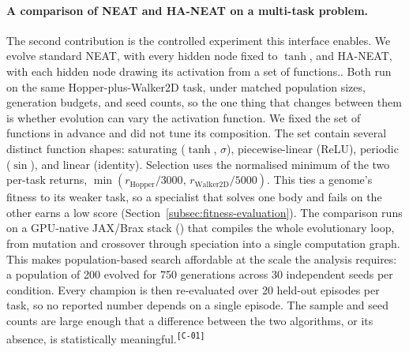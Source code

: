 \documentclass[12pt]{article}
\newcommand{\revID}[1]{\textsuperscript{\scriptsize\texttt{[#1]}}}
\newcommand{\revWeak}[2]{\textcolor{revOrange}{#2}\revID{#1}}
\begin{document}
\paragraph{A comparison of NEAT and HA-NEAT on a multi-task problem.}
The second contribution is the controlled experiment this interface enables.
We evolve standard NEAT, with every hidden node fixed to $\tanh$, and HA-NEAT, with each hidden node drawing its activation from a set of functions..
Both run on the same Hopper-plus-Walker2D task, under matched population sizes, generation budgets, and seed counts, so the one thing that changes between them is whether evolution can vary the activation function.
We fixed the set of functions in advance and did not tune its composition.
The set contain several distinct function shapes: saturating ($\tanh$, $\sigma$), piecewise-linear (ReLU), periodic ($\sin$), and linear (identity).
Selection uses the normalised minimum of the two per-task returns, $\min(r_{\text{Hopper}}/3000,\, r_{\text{Walker2D}}/5000)$.
This ties a genome's fitness to its weaker task, so a specialist that solves one body and fails on the other earns a low score (Section~\ref{subsec:fitness-evaluation}).
The comparison runs on a GPU-native JAX/Brax stack (\cite{freeman_brax_2021,wang_tensorized_2024}) that compiles the whole evolutionary loop, from mutation and crossover through speciation into a single computation graph.
This makes population-based search affordable at the scale the analysis requires: a population of 200 evolved for 750 generations across 30 independent seeds per condition.
Every champion is then re-evaluated over 20 held-out episodes per task, so no reported number depends on a single episode.
\revWeak{C-01}{The sample and seed counts are large enough that a difference between the two algorithms, or its absence, is statistically meaningful.}

\end{document}
